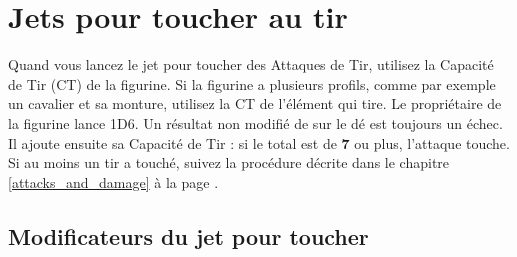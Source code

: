 \section{Jets pour toucher au tir}

Quand vous lancez le jet pour toucher des Attaques de Tir, utilisez la Capacité de Tir (CT) de la figurine. Si la figurine a plusieurs profils, comme par exemple un cavalier et sa monture, utilisez la CT de l'élément qui tire. Le propriétaire de la figurine lance 1D6. Un résultat non modifié de  sur le dé est toujours un échec. Il ajoute ensuite sa Capacité de Tir : si le total est de \textbf{7} ou plus, l'attaque touche. Si au moins un tir a touché, suivez la procédure décrite dans le chapitre \ref{attacks_and_damage} à la page \pageref{attacks_and_damage}.

\newpage
\subsection{Modificateurs du jet pour toucher}
\label{to_hit_modifiers}

